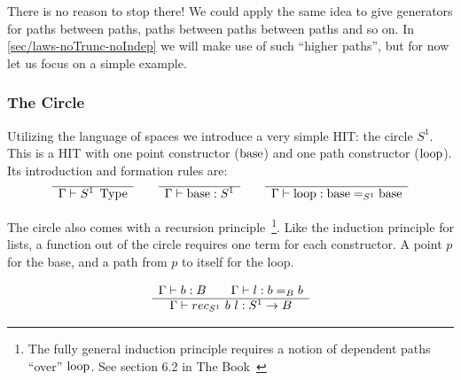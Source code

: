 There is no reason to stop there! We could apply the same idea to give
generators for paths between paths, paths between paths between
paths and so on. In \autoref{sec/laws-noTrunc-noIndep} we will make use of
such ``higher paths'', but for now let us focus on a simple example.

\subsubsection{The Circle}
Utilizing the language of spaces we introduce a very simple HIT: the circle
$S^1$. This is a HIT with one point constructor ($\operatorname{base}$) and one path constructor
($\operatorname{loop}$). Its introduction and formation rules are:
\begin{equation*}
  \begin{array}[t]{c}
    \hline
    \Gamma \vdash S^1 \; \operatorname{Type}\\
  \end{array}
  \qquad
  \begin{array}[t]{c}
    \hline
    \Gamma \vdash \operatorname{base} : S^1\\
  \end{array}
  \qquad
  \begin{array}[t]{c}
    \hline
    \Gamma \vdash \operatorname{loop} : \operatorname{base} =_{S^1} \operatorname{base}
  \end{array}
\end{equation*}

The circle also comes with a recursion principle~\footnote{The fully general
  induction principle requires a notion of dependent paths ``over'' $\operatorname{loop}$. See section 6.2 in
  The Book~\cite{hottbook}}. Like the induction principle for lists,
a function out of the circle requires one term for each constructor. A point $p$
for the base, and a path from $p$ to itself for the loop.

\begin{equation*}
  \begin{array}[t]{c}
    \Gamma \vdash b : B \qquad \Gamma \vdash l : b =_B b\\
    \hline
    \Gamma \vdash rec_{S^1}~b~l : S^1 \rightarrow B
  \end{array}
\end{equation*}

